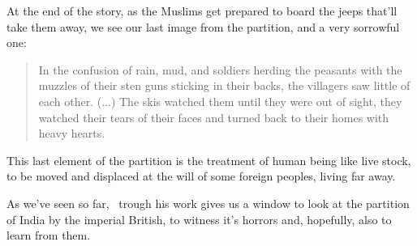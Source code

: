 \documentclass{scrartcl}
\begin{document}
At the end of the story, as the Muslims get prepared
to board the jeeps that'll take them away,
we see our last image from the partition, and
a very sorrowful one:
\begin{quote}
  In the confusion of rain, mud, and soldiers
  herding the peasants with the muzzles of their sten guns
  sticking in their backs, the villagers saw little of each other.
  (...)
  The skis watched them until they were out of sight,
  they watched their tears of their faces and turned back to
  their homes with heavy hearts.
  \cite[p. 185, para. 1]{khushwant_singh_train_1990}
\end{quote}
This last element of the partition is the treatment
of human being like live stock, to be moved and displaced
at the will of some foreign peoples,
living far away.

As we've seen so far,
\ks\ trough his work gives us a window
to look at the partition of India
by the imperial British,
to witness it's horrors and,
hopefully,
also to learn from them.
%
\printbibliography

\end{document}
